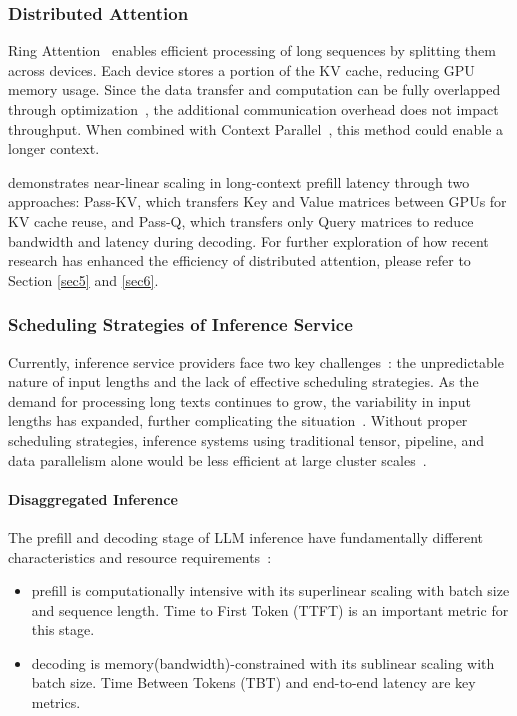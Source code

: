 \subsubsection{Distributed Attention}

Ring Attention~\citep{li2021sequence} enables efficient processing of long sequences by splitting them across devices. Each device stores a portion of the KV cache, reducing GPU memory usage. Since the data transfer and computation can be fully overlapped through optimization~\citep{liu2023ring, fang2024uspunifiedsequenceparallelism}, the additional communication overhead does not impact throughput. When combined with Context Parallel~\citep{Shoeybi2019MegatronLMTM}, this method could enable a longer context.

\citet{yang2024context} demonstrates near-linear scaling in long-context prefill latency through two approaches: Pass-KV, which transfers Key and Value matrices between GPUs for KV cache reuse, and Pass-Q, which transfers only Query matrices to reduce bandwidth and latency during decoding. For further exploration of how recent research has enhanced the efficiency of distributed attention, please refer to Section \ref{sec5} and \ref{sec6}.

\subsubsection{Scheduling Strategies of Inference Service}

Currently, inference service providers face two key challenges~\citep{sun2024llumnix}: the unpredictable nature of input lengths and the lack of effective scheduling strategies. As the demand for processing long texts continues to grow, the variability in input lengths has expanded, further complicating the situation~\citep{semianalysis2024ScalingLawO1Pro}. Without proper scheduling strategies, inference systems using traditional tensor, pipeline, and data parallelism alone would be less efficient at large cluster scales~\citep{guo2024survey}.

\paragraph{Disaggregated Inference}
The prefill and decoding stage of LLM inference have fundamentally different characteristics and resource requirements~\citep{Venkat2024EssentialMath, patel2024splitwise, qin2024mooncake}:
\begin{itemize}[leftmargin=2em]
    \item prefill is computationally intensive with its superlinear scaling with batch size and sequence length. Time to First Token (TTFT) is an important metric for this stage.
    \item decoding is memory(bandwidth)-constrained with its sublinear scaling with batch size. Time Between Tokens (TBT) and end-to-end latency are key metrics.
\end{itemize}


